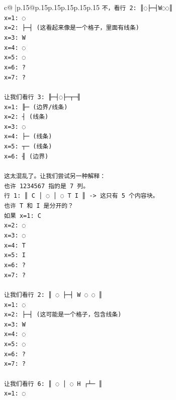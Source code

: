 \documentclass{article}
\begin{document}
{\begin{supertabular}{c@{$\;$}|p{.15\linewidth}@{}p{.15\linewidth}p{.15\linewidth}p{.15\linewidth}p{.15\linewidth}p{.15\linewidth}}
{{{\texttt{不，看行 2: ║◌├─┤W◌◌║} \\
\texttt{x=1: ◌} \\
\texttt{x=2: ├─┤ (这看起来像是一个格子，里面有线条)} \\
\texttt{x=3: W} \\
\texttt{x=4: ◌} \\
\texttt{x=5: ◌} \\
\texttt{x=6: ?} \\
\texttt{x=7: ?} \\
\\ 
\texttt{让我们看行 3: ╟─┤◌├─┬─╢} \\
\texttt{x=1: ╟─ (边界/线条)} \\
\texttt{x=2: ┤ (线条)} \\
\texttt{x=3: ◌} \\
\texttt{x=4: ├─ (线条)} \\
\texttt{x=5: ┬─ (线条)} \\
\texttt{x=6: ╢ (边界)} \\
\\ 
\texttt{这太混乱了。让我们尝试另一种解释：} \\
\texttt{也许 1234567 指的是 7 列。} \\
\texttt{行 1: ║ C │ ◌ │ ◌ T I ║ {-}> 这只有 5 个内容块。} \\
\texttt{也许 T 和 I 是分开的？} \\
\texttt{如果 x=1: C} \\
\texttt{x=2: ◌} \\
\texttt{x=3: ◌} \\
\texttt{x=4: T} \\
\texttt{x=5: I} \\
\texttt{x=6: ?} \\
\texttt{x=7: ?} \\
\\ 
\texttt{让我们看行 2: ║ ◌ ├─┤ W ◌ ◌ ║} \\
\texttt{x=1: ◌} \\
\texttt{x=2: ├─┤ (这可能是一个格子，包含线条)} \\
\texttt{x=3: W} \\
\texttt{x=4: ◌} \\
\texttt{x=5: ◌} \\
\texttt{x=6: ?} \\
\texttt{x=7: ?} \\
\\ 
\texttt{让我们看行 6: ║ ◌ │ ◌ H ┌┴─ ║} \\
\texttt{x=1: ◌} \\
}}}
\end{supertabular}}
\end{document}
